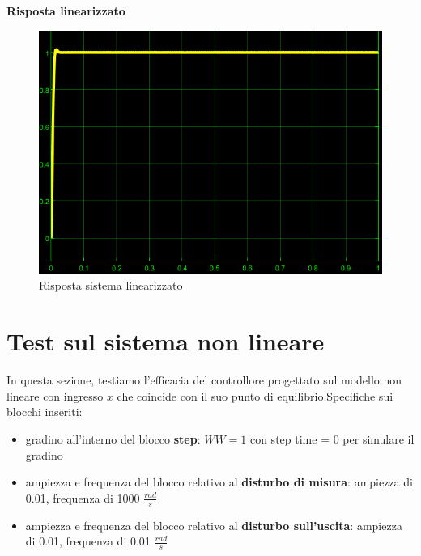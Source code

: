 \documentclass[a4paper, 11pt]{article}
\begin{document}
\vspace{1cm}

\textbf{Risposta linearizzato}

\begin{figure} [!h]
    \centering
    \includegraphics[scale = 0.9]{Immagini/linearizzato_risposta.png}
    \caption{Risposta sistema linearizzato}
    \label{fig:enter-label}
\end{figure}

\vspace{20 cm}

\section{Test sul sistema non lineare}

In questa sezione, testiamo l'efficacia del controllore progettato sul modello non lineare con ingresso $x$ che coincide con il suo punto di equilibrio.Specifiche sui blocchi inseriti:

\begin{itemize}
    \item gradino all'interno del blocco \textbf{step}: $WW = 1$ con step time = 0 per simulare il gradino
    \item ampiezza e frequenza del blocco relativo al \textbf{disturbo di misura}: ampiezza di 0.01, frequenza di 1000 $\frac{rad}{s}$
    \item ampiezza e frequenza del blocco relativo al \textbf{disturbo sull'uscita}:
    ampiezza di 0.01, frequenza di 0.01 $\frac{rad}{s}$
\end{itemize}

\vspace{0.2cm}
\end{document}
